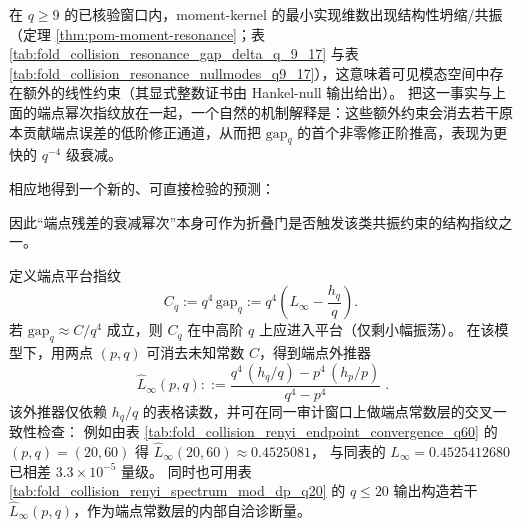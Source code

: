 \begin{remark}\label{rem:pom-endpoint-gap-resonance-link}
在 \(q\ge 9\) 的已核验窗口内，moment-kernel 的最小实现维数出现结构性坍缩/共振（定理 \ref{thm:pom-moment-resonance}；表 \ref{tab:fold_collision_resonance_gap_delta_q_9_17} 与表 \ref{tab:fold_collision_resonance_nullmodes_q9_17}），这意味着可见模态空间中存在额外的线性约束（其显式整数证书由 Hankel-null 输出给出）。
把这一事实与上面的端点幂次指纹放在一起，一个自然的机制解释是：这些额外约束会消去若干原本贡献端点误差的低阶修正通道，从而把 \(\mathrm{gap}_q\) 的首个非零修正阶推高，表现为更快的 \(q^{-4}\) 级衰减。
\par
相应地得到一个新的、可直接检验的预测：
\begin{center}
\end{center}
因此“端点残差的衰减幂次”本身可作为折叠门是否触发该类共振约束的结构指纹之一。
\end{remark}

\begin{remark}\label{rem:pom-endpoint-extrapolator}
定义端点平台指纹
\[
C_q:=q^4\,\mathrm{gap}_q
:=q^4\left(L_\infty-\frac{h_q}{q}\right).
\]
若 \(\mathrm{gap}_q\approx C/q^4\) 成立，则 \(C_q\) 在中高阶 \(q\) 上应进入平台（仅剩小幅振荡）。
在该模型下，用两点 \((p,q)\) 可消去未知常数 \(C\)，得到端点外推器
\[
\boxed{\;
\widehat L_\infty(p,q)
::=\frac{q^4\,(h_q/q)-p^4\,(h_p/p)}{q^4-p^4}\; }.
\]
该外推器仅依赖 \(h_q/q\) 的表格读数，并可在同一审计窗口上做端点常数层的交叉一致性检查：
例如由表 \ref{tab:fold_collision_renyi_endpoint_convergence_q60} 的 \((p,q)=(20,60)\) 得
\(
\widehat L_\infty(20,60)\approx 0.4525081
\)，
与同表的 \(L_\infty=0.4525412680\) 已相差 \(3.3\times 10^{-5}\) 量级。
同时也可用表 \ref{tab:fold_collision_renyi_spectrum_mod_dp_q20} 的 \(q\le 20\) 输出构造若干 \(\widehat L_\infty(p,q)\)，作为端点常数层的内部自洽诊断量。
\end{remark}

